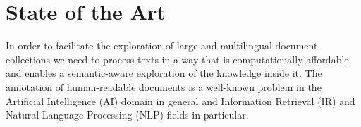 

\chapter{State of the Art}\label{ch:soa}

\graphicspath{{soa/figures/}}



In order to facilitate the exploration of large and multilingual document collections we need to process texts in a way that is computationally affordable and enables a semantic-aware exploration of the knowledge inside it. The annotation of human-readable documents is a well-known problem in the Artificial Intelligence (AI) domain in general and Information Retrieval (IR) and Natural Language Processing (NLP) fields in particular. 

